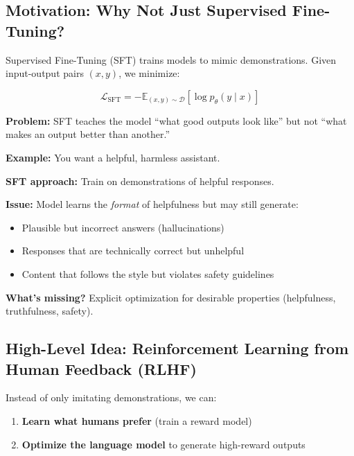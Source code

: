 \documentclass{article}
\begin{document}
\subsection{Motivation: Why Not Just Supervised Fine-Tuning?}

Supervised Fine-Tuning (SFT) trains models to mimic demonstrations. Given input-output pairs $(x, y)$, we minimize:

\begin{equation}
\mathcal{L}_{\text{SFT}} = -\mathbb{E}_{(x,y) \sim \mathcal{D}} \left[ \log p_\theta(y \mid x) \right]
\end{equation}

\textbf{Problem:} SFT teaches the model ``what good outputs look like'' but not ``what makes an output better than another.''

\begin{tcolorbox}[colback=yellow!5!white, colframe=orange!50!black, title=SFT Limitations]
\textbf{Example:} You want a helpful, harmless assistant.

\textbf{SFT approach:} Train on demonstrations of helpful responses.

\textbf{Issue:} Model learns the \textit{format} of helpfulness but may still generate:
\begin{itemize}
\item Plausible but incorrect answers (hallucinations)
\item Responses that are technically correct but unhelpful
\item Content that follows the style but violates safety guidelines
\end{itemize}

\textbf{What's missing?} Explicit optimization for desirable properties (helpfulness, truthfulness, safety).
\end{tcolorbox}

\subsection{High-Level Idea: Reinforcement Learning from Human Feedback (RLHF)}

Instead of only imitating demonstrations, we can:

\begin{enumerate}
\item \textbf{Learn what humans prefer} (train a reward model)
\item \textbf{Optimize the language model} to generate high-reward outputs
\end{enumerate}
\end{document}
